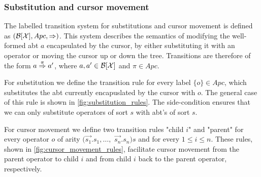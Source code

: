 \documentclass[sigplan,screen]{acmart}
\begin{document}
\subsubsection{Substitution and cursor movement}
The labelled transition system for substitutions and cursor movement is defined as $(\mathcal{B}[\mathcal{X} ], Apc, \Rightarrow)$. This system describes the semantics of modifying the well-formed abt $a$ encapsulated by the cursor, by either substituting it with an operator or moving the cursor up or down the tree. Transitions are therefore of the form $a \stackrel{\pi}{\Rightarrow} a'$, where $a, a' \in \mathcal{B}[\mathcal{X} ]$ and $\pi \in Apc$.

For substitution we define the transition rule for every label $\{o\} \in Apc$, which substitutes the abt currently encapuslated by the cursor with $o$. The general case of this rule is shown in \cref{fig:substitution_rules}. The side-condition ensures that we can only substitute operators of sort $s$ with abt's of sort $s$.

For cursor movement we define two transition rules "child  $i$" and "parent" for every operator $o$ of arity $(\Vec{s_1}.s_1, \dots,$ $ \Vec{s_n}.s_n)s$ and for every $1 \leq i \leq n$. These rules, shown in \cref{fig:cursor_movement_rules}, facilitate cursor movement from the parent operator to child $i$ and from child $i$ back to the parent operator, respectively.
\end{document}
